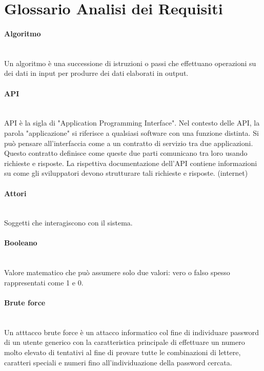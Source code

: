 \section{Glossario Analisi dei Requisiti}

\paragraph{Algoritmo}~\smallskip \\
Un algoritmo è una successione di istruzioni o passi che effettuano operazioni su dei dati in input per produrre dei dati elaborati in output.

\paragraph{API}~\smallskip \\
API è la sigla di "Application Programming Interface". Nel contesto delle API, la parola "applicazione" si riferisce a qualsiasi software con una funzione distinta. Si può pensare all'interfaccia come a un contratto di servizio tra due applicazioni. Questo contratto definisce come queste due parti comunicano tra loro usando richieste e risposte. La rispettiva documentazione dell'API contiene informazioni su come gli sviluppatori devono strutturare tali richieste e risposte. (internet)

\paragraph{Attori}~\smallskip \\
Soggetti che interagiscono con il sistema.

\paragraph{Booleano}~\smallskip \\
Valore matematico che può assumere solo due valori: vero o falso spesso rappresentati come 1 e 0.

\paragraph{Brute force}~\smallskip \\
Un atttacco brute force è un attacco informatico col fine di individuare password di un utente generico con la caratteristica principale di effettuare un numero molto elevato di tentativi al fine di provare tutte le combinazioni di lettere, caratteri speciali e numeri fino all'individuazione della password cercata.

